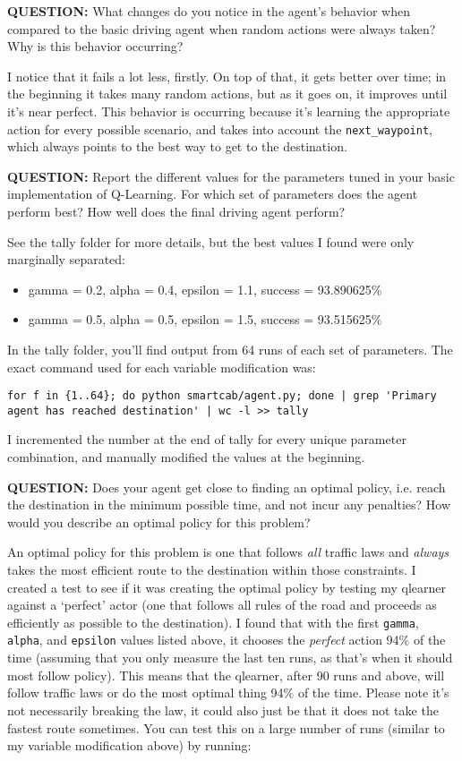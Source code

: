\documentclass[11pt]{article}
\begin{document}
\textbf{QUESTION:} What changes do you notice in the agent's behavior when compared to the basic driving agent when random actions were always taken? Why is this behavior occurring?

I notice that it fails a lot less, firstly. On top of that, it gets better over time; in the beginning it takes many random actions, but as it goes on, it improves until it's near perfect. This behavior is occurring because it's learning the appropriate action for every possible scenario, and takes into account the \texttt{next\_waypoint}, which always points to the best way to get to the destination.

\textbf{QUESTION:} Report the different values for the parameters tuned in your basic implementation of Q-Learning. For which set of parameters does the agent perform best? How well does the final driving agent perform?

See the tally folder for more details, but the best values I found were only marginally separated:
\begin{itemize}
\item gamma = 0.2, alpha = 0.4, epsilon = 1.1, success = 93.890625\%
\item gamma = 0.5, alpha = 0.5, epsilon = 1.5, success = 93.515625\%
\end{itemize}

In the tally folder, you'll find output from 64 runs of each set of parameters. The exact command used for each variable modification was:

\begin{lstlisting}
for f in {1..64}; do python smartcab/agent.py; done | grep 'Primary agent has reached destination' | wc -l >> tally
\end{lstlisting}

I incremented the number at the end of tally for every unique parameter combination, and manually modified the values at the beginning.

\textbf{QUESTION:} Does your agent get close to finding an optimal policy, i.e. reach the destination in the minimum possible time, and not incur any penalties? How would you describe an optimal policy for this problem?

An optimal policy for this problem is one that follows \emph{all} traffic laws and \emph{always} takes the most efficient route to the destination within those constraints. I created a test to see if it was creating the optimal policy by testing my qlearner against a `perfect' actor (one that follows all rules of the road and proceeds as efficiently as possible to the destination). I found that with the first \texttt{gamma}, \texttt{alpha}, and \texttt{epsilon} values listed above, it chooses the \emph{perfect} action 94\% of the time (assuming that you only measure the last ten runs, as that's when it should most follow policy). This means that the qlearner, after 90 runs and above, will follow traffic laws or do the most optimal thing 94\% of the time. Please note it's not necessarily breaking the law, it could also just be that it does not take the fastest route sometimes. You can test this on a large number of runs (similar to my variable modification above) by running:
\end{document}
